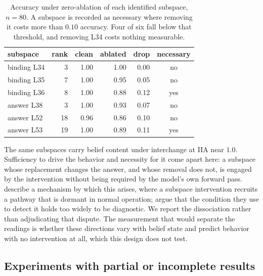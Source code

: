 \documentclass{article}
\begin{document}
\begin{table}[h]
\centering
\small
\begin{tabular}{lrrrrc}
\toprule
subspace & rank & clean & ablated & drop & necessary \\
\midrule
binding L34 & 3 & 1.00 & 1.00 & 0.00 & no \\
binding L35 & 7 & 1.00 & 0.95 & 0.05 & no \\
binding L36 & 8 & 1.00 & 0.88 & 0.12 & yes \\
answer L38 & 3 & 1.00 & 0.93 & 0.07 & no \\
answer L52 & 18 & 0.96 & 0.86 & 0.10 & no \\
answer L53 & 19 & 1.00 & 0.89 & 0.11 & yes \\
\bottomrule
\end{tabular}
\caption{Accuracy under zero-ablation of each identified subspace, $n = 80$. A subspace is
recorded as necessary where removing it costs more than $0.10$ accuracy. Four of six fall
below that threshold, and removing L34 costs nothing measurable.}
\label{tab:ablation}
\end{table}

The same subspaces carry belief content under interchange at IIA near $1.0$. Sufficiency to
drive the behavior and necessity for it come apart here: a subspace whose replacement changes
the answer, and whose removal does not, is engaged by the intervention without being required
by the model's own forward pass. \citet{makelov2024illusion} describe a mechanism by which
this arises, where a subspace intervention recruits a pathway that is dormant in normal
operation; \citet{wu2024replyillusion} argue that the condition they use to detect it holds
too widely to be diagnostic. We report the dissociation rather than adjudicating that
dispute. The measurement that would separate the readings is whether these directions vary
with belief state and predict behavior with no intervention at all, which this design does
not test.

\subsection{Experiments with partial or incomplete results}
\end{document}
